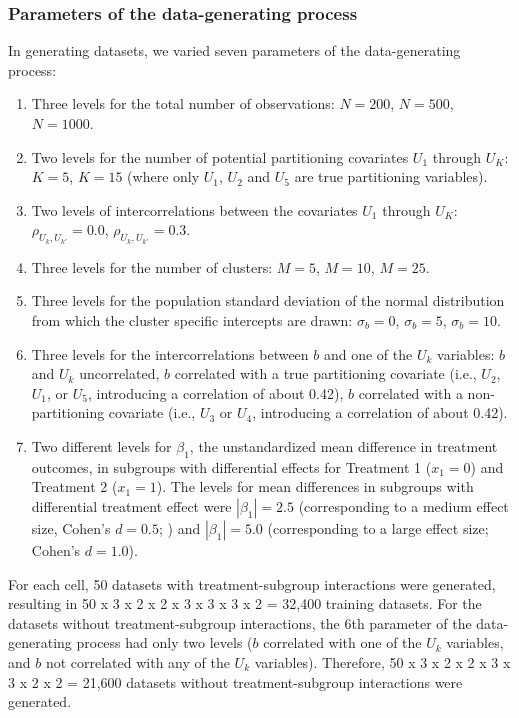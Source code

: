 \documentclass[nobf,doc]{apa}
\begin{document}
\subsubsection{Parameters of the data-generating process}

In generating datasets, we varied seven parameters of the data-generating process:
 
\begin{enumerate} 
\item Three levels for the total number of observations: $N=200$, $N=500$, $N=1000$.
\item Two levels for the number of potential partitioning covariates $U_1$ through $U_K$: $K=5$, $K=15$ (where only $U_1$, $U_2$ and $U_5$ are true partitioning variables).
\item Two levels of intercorrelations between the covariates $U_1$ through $U_K$: $\rho_{U_{k},U_{k'}}=0.0$, $\rho_{U_{k},U_{k'}}=0.3$.
\item Three levels for the number of clusters: $M=5$, $M=10$, $M=25$.
\item Three levels for the population standard deviation of the normal distribution from which the cluster specific intercepts are drawn: $\sigma_{b}=0$, $\sigma_{b}=5$, $\sigma_{b}=10$.
\item Three levels for the intercorrelations between $b$ and one of the $U_k$ variables: $b$ and $U_k$ uncorrelated, $b$ correlated with a true partitioning covariate (i.e., $U_2$, $U_1$, or $U_5$, introducing a correlation of about 0.42), $b$ correlated with a non-partitioning covariate (i.e., $U_3$ or $U_4$, introducing a correlation of about 0.42). 
\item Two different levels for $\beta_1$, the unstandardized mean difference in treatment outcomes, in subgroups with differential effects for Treatment 1 ($x_{1}=0$) and Treatment 2 ($x_{1}=1$). The levels for mean differences in subgroups with differential treatment effect were $|\beta_1| = 2.5$ (corresponding to a medium effect size, Cohen's $d = 0.5$; ) and $|\beta_1| = 5.0$ (corresponding to a large effect size; Cohen's $d = 1.0$).
\end{enumerate}

For each cell, 50 datasets with treatment-subgroup interactions were generated, resulting in 50 x 3 x 2 x 2 x 3 x 3 x 3 x 2 = 32,400 training datasets. For the datasets without treatment-subgroup interactions, the 6th parameter of the data-generating process had only two levels ($b$ correlated with one of the $U_k$ variables, and $b$ not correlated with any of the $U_k$ variables). Therefore, 50 x 3 x 2 x 2 x 3 x 3 x 2 x 2 = 21,600 datasets without treatment-subgroup interactions were generated.
\end{document}
